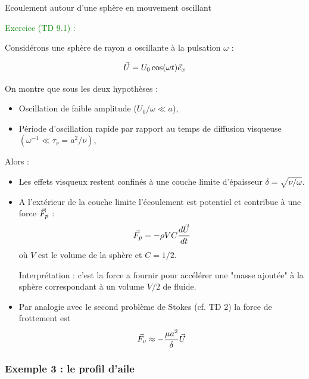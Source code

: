 \begin{frame}{Ecoulement autour d'une sphère en mouvement oscillant}
\small

\textcolor{green}{Exercice (TD 9.1) : } 

Considérons une sphère de rayon $a$ oscillante à la pulsation $\omega$ :

$$\vec{U} = U_0 \cos  (\omega t) \vec{e}_x$$ 


On montre que sous les deux hypothèses :
\begin{itemize}
\item Oscillation de faible amplitude  ($U_0/\omega \ll a$),

\item Période d'oscillation rapide par rapport au temps de diffusion visqueuse  $(\omega^{-1} \ll \tau_v = a^2 / \nu )$,
\end{itemize}

Alors :

\begin{itemize}

\item 
Les effets visqueux restent confinés à une couche limite d'épaisseur $\delta = \sqrt{\nu/\omega}$.


\item 
A l'extérieur de la couche limite l'écoulement est potentiel et contribue à une force $\vec{F}_p$ :
$$
\vec{F}_p = - \rho V C \frac{d \vec{U}}{d t} 
$$
où $V$ est le volume de la sphère et $C = 1/2$.

Interprétation : c'est la force a fournir pour accélérer une "masse ajoutée" à la sphère 
correspondant à un volume $V/2$ de fluide.

\item
Par analogie avec le second problème de Stokes (cf. TD 2) la force de frottement est 
$$
\vec{F}_v  \approx - \frac{\mu a^2}{\delta} \vec{U} 
$$

\end{itemize}

\end{frame}



\subsubsection{Exemple 3 : le profil d'aile}


